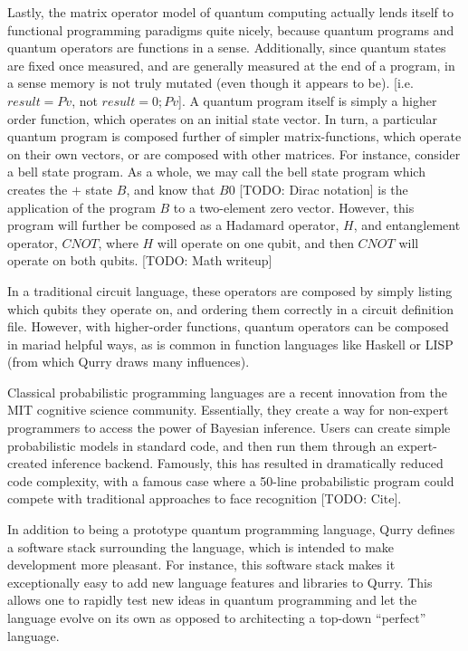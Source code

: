 \documentclass[journal]{article}
\begin{document}
Lastly, the matrix operator model of quantum computing actually lends itself to functional programming paradigms quite nicely, because quantum programs and quantum operators are functions in a sense.
Additionally, since quantum states are fixed once measured, and are generally measured at the end of a program, in a sense memory is not truly mutated (even though it appears to be). 
[i.e. $result = Pv$, not $result = 0; Pv$].
A quantum program itself is simply a higher order function, which operates on an initial state vector.
In turn, a particular quantum program is composed further of simpler matrix-functions, which operate on their own vectors, or are composed with other matrices.
For instance, consider a bell state program. 
As a whole, we may call the bell state program which creates the $+$ state $B$, and know that $B 0$ [TODO: Dirac notation] is the application of the program $B$ to a two-element zero vector.
However, this program will further be composed as a Hadamard operator, $H$, and entanglement operator, $CNOT$, where $H$ will operate on one qubit, and then $CNOT$ will operate on both qubits. [TODO: Math writeup]

In a traditional circuit language, these operators are composed by simply listing which qubits they operate on, and ordering them correctly in a circuit definition file.
However, with higher-order functions, quantum operators can be composed in mariad helpful ways, as is common in function languages like Haskell or LISP (from which Qurry draws many influences).

 Classical probabilistic programming languages are a recent innovation from the MIT cognitive science community. 
 Essentially, they create a way for non-expert programmers to access the power of Bayesian inference. 
 Users can create simple probabilistic models in standard code, and then run them through an expert-created inference backend.
 Famously, this has resulted in dramatically reduced code complexity, with a famous case where a 50-line probabilistic program could compete with traditional approaches to face recognition [TODO: Cite].
 

In addition to being a prototype quantum programming language, Qurry defines a software stack surrounding the language, which is intended to make development more pleasant.
For instance, this software stack makes it exceptionally easy to add new language features and libraries to Qurry.
This allows one to rapidly test new ideas in quantum programming and let the language evolve on its own as opposed to architecting a top-down ``perfect'' language.
\end{document}
